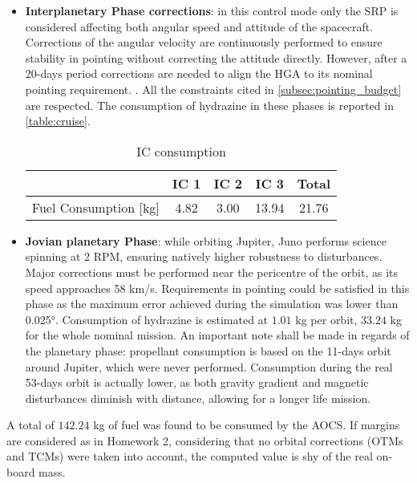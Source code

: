\begin{itemize}
    \item \textbf{Interplanetary Phase corrections}: in this control mode only the SRP is considered affecting both angular speed and attitude of the spacecraft. Corrections of the angular velocity are continuously performed to ensure stability in pointing without correcting the attitude directly. However, after a 20-days period corrections are needed to align the HGA to its nominal pointing requirement. \cite{LL_early_cruise}. All the constraints cited in \autoref{subsec:pointing_budget} are respected. 
    The consumption of hydrazine in these phases is reported in \autoref{table:cruise}.

    \begin{table}[H]
        \renewcommand{\arraystretch}{1.3}
        \centering
        \small
        \begin{tabular}{|c|c|c|c|c|}
            \hline
            &\textbf{IC 1} &\textbf{IC 2} & \textbf{IC 3} &\textbf{Total}\\
            \hline
            \hline
            Fuel Consumption [kg] & 4.82 & 3.00 & 13.94 & 21.76 \\
            \hline
        \end{tabular}
        \caption{IC consumption}
        \label{table:cruise}
    \end{table}
    \vspace*{-3mm}

    \item \textbf{Jovian planetary Phase}: while orbiting Jupiter, Juno performs science spinning at 2 RPM, ensuring natively higher robustness to disturbances. Major corrections must be performed near the pericentre of the orbit, as its speed approaches 58 km/s.  
    Requirements in pointing could be satisfied in this phase as the maximum error achieved during the simulation was lower than 0.025°.  Consumption of hydrazine is estimated at $1.01$ kg per orbit, $33.24$ kg for the whole nominal mission.
    An important note shall be made in regards of the planetary phase: propellant consumption is based on the 11-days orbit around Jupiter, which were never performed. Consumption during the real 53-days orbit is actually lower, as both gravity gradient and magnetic disturbances diminish with distance, allowing for a longer life mission.
\end{itemize}

A total of $142.24$ kg of fuel was found to be consumed by the AOCS. If margins are considered as in Homework 2, considering that no orbital corrections (OTMs and TCMs) were taken into account, the computed value is shy of the real on-board mass.